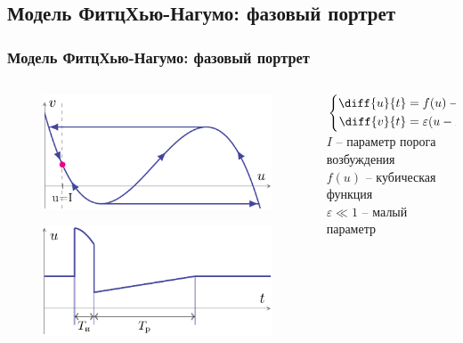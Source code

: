 \subsection{Модель ФитцХью-Нагумо: фазовый портрет}
\begin{frame}[t]
	\frametitle{Модель ФитцХью-Нагумо: фазовый портрет}
	\begin{columns}[c]	
		\begin{column}{0.59\textwidth}
			\vspace{-2em}
			\begin{figure}[h]
				\centering
				\hspace{1em}\includegraphics[]{img/img_3a}
			\end{figure}
			\vspace{-2em}
			\begin{figure}[h]
				\centering
				\hspace{1em}\includegraphics[]{img/img_3b}
			\end{figure}
		\end{column}
		\begin{column}{0.39\textwidth}
			$
				\left\{
				\begin{aligned}
					\diff{u}{t} & =f(u)-v           \\
					\diff{v}{t} & =\varepsilon(u-I)
				\end{aligned}
				\right.
			$\\
			\vspace{1em}
			$I$ -- параметр порога возбуждения\\
			\vspace{1em}
			$f(u)$ -- кубическая функция\\
			\vspace{1em}
			$\varepsilon \ll 1$ -- малый параметр
		\end{column}
	\end{columns}
\end{frame}
